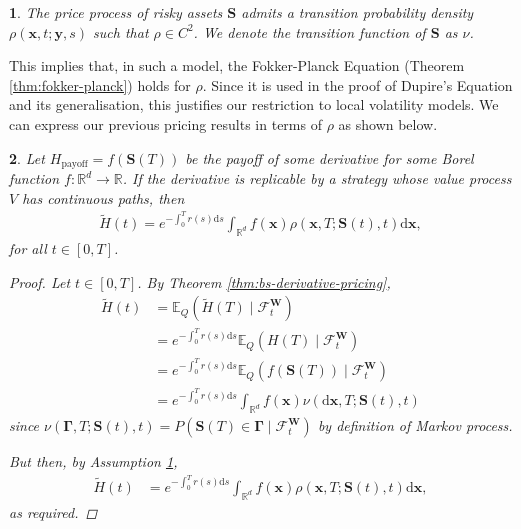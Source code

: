 \documentclass[english]{article}
\numberwithin{equation}{section}
\numberwithin{figure}{section}
\theoremstyle{bolddescit}
\newtheorem{theorem}{\protect\theoremname}[section]
\theoremstyle{definition}
\theoremstyle{definition}
\theoremstyle{plain}
\theoremstyle{plain}
\theoremstyle{bolddesc}
\newtheorem{assumption}[theorem]{\protect\assumptionname}
\theoremstyle{plain}
\theoremstyle{remark}
\providecommand{\assumptionname}{Assumption}
\providecommand{\theoremname}{Theorem}
\begin{document}
\begin{assumption}\label{ass:local-density}
  The price process of risky assets $\mathbf{S}$ admits a transition probability density $\rho(\mathbf{x},t;\mathbf{y},s)$ such that $\rho \in C^2$. We denote the transition function of $\mathbf{S}$ as $\nu$.
\end{assumption}

This implies that, in such a model, the Fokker-Planck Equation (Theorem \ref{thm:fokker-planck}) holds for $\rho$. Since it is used in the proof of Dupire's Equation and its generalisation, this justifies our restriction to local volatility models. We can express our previous pricing results in terms of $\rho$ as shown below.

\begin{theorem}\label{thm:local-derivative-pricing}
  Let $H_\text{payoff} = f(\mathbf{S}(T))$ be the payoff of some derivative for some Borel function $f : \mathbb{R}^d \to \mathbb{R}$.
  If the derivative is replicable by a strategy whose value process $V$ has continuous paths, then
  \begin{align}\label{eq:local-derivative-pricing}
    \widetilde{H}(t) = e^{-\int_0^T r(s) \mathrm{d}s} \int_{\mathbb{R}^d} f(\mathbf{x}) \rho(\mathbf{x},T;\mathbf{S}(t),t) \mathrm{d}\mathbf{x},
  \end{align}
  for all $t \in [0,T]$.

  \begin{proof}
    Let $t \in [0,T]$. By Theorem \ref{thm:bs-derivative-pricing},
    \begin{align*}
      \widetilde{H}(t)
      &= \mathbb{E}_Q(\widetilde{H}(T) \mid \mathcal{F}^\mathbf{W}_t)\\
      &= e^{-\int_0^T r(s) \mathrm{d}s} \mathbb{E}_Q(H(T) \mid \mathcal{F}^\mathbf{W}_t) \tag{$r$ is deterministic}\\
      &= e^{-\int_0^T r(s) \mathrm{d}s} \mathbb{E}_Q(f(\mathbf{S}(T)) \mid \mathcal{F}^\mathbf{W}_t)\\
      &= e^{-\int_0^T r(s) \mathrm{d}s} \int_{\mathbb{R}^d} f(\mathbf{x}) \nu(\mathrm{d}\mathbf{x},T;\mathbf{S}(t),t)
    \end{align*}
    since $\nu(\mathbf{\Gamma},T;\mathbf{S}(t),t) = P(\mathbf{S}(T) \in \mathbf{\Gamma} \mid \mathcal{F}^\mathbf{W}_t)$ by definition of Markov process.

    But then, by Assumption \ref{ass:local-density},
    \begin{align*}
      \widetilde{H}(t)
      &= e^{-\int_0^T r(s) \mathrm{d}s} \int_{\mathbb{R}^d} f(\mathbf{x}) \rho(\mathbf{x},T;\mathbf{S}(t),t) \mathrm{d}\mathbf{x},
    \end{align*}
    as required.
  \end{proof}
\end{theorem}
\end{document}
